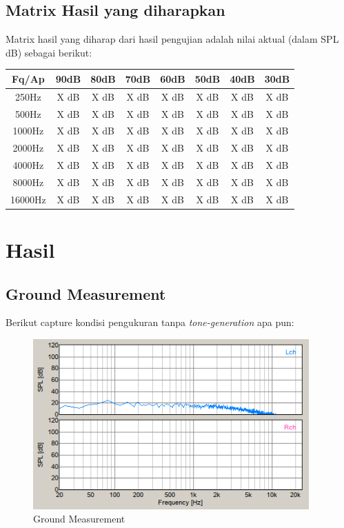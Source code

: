 \documentclass[12pt,]{article}
\begin{document}
	\subsection{Matrix Hasil yang diharapkan}
	
	Matrix hasil yang diharap dari hasil pengujian adalah nilai aktual (dalam SPL dB) sebagai berikut:
	
	\begin{center}
		\begin{tabular}{|c|c|c|c|c|c|c|c|} 
			\hline
			Fq/Ap & 90dB & 80dB & 70dB & 60dB & 50dB & 40dB & 30dB\\ [0.5ex] 
			\hline\hline
			250Hz & X dB & X dB & X dB & X dB & X dB & X dB & X dB \\
			\hline
			500Hz & X dB & X dB & X dB & X dB & X dB & X dB & X dB \\
			\hline
			1000Hz & X dB & X dB & X dB & X dB & X dB & X dB & X dB \\
			\hline
			2000Hz & X dB & X dB & X dB & X dB & X dB & X dB & X dB \\
			\hline
			4000Hz & X dB & X dB & X dB & X dB & X dB & X dB & X dB \\
			\hline
			8000Hz & X dB & X dB & X dB & X dB & X dB & X dB & X dB \\
			\hline
			16000Hz & X dB & X dB & X dB & X dB & X dB & X dB & X dB \\
			\hline
		\end{tabular}
	\end{center}

	\section{Hasil}
	
	\subsection{Ground Measurement}
	
	Berikut capture kondisi pengukuran tanpa \textit{tone-generation} apa pun:
	
	\begin{figure}[!ht]
		\centering
		\includegraphics[width=300pt]{hasil_rpi/ground_Aweight}
		\caption{Ground Measurement}
	\end{figure}
\end{document}
